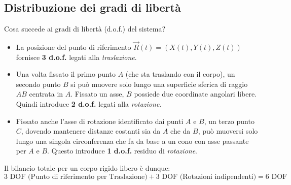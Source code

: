 \subsection{Distribuzione dei gradi di libertà}
Cosa succede ai gradi di libertà (d.o.f.) del sistema?
\begin{itemize}
    \item La posizione del punto di riferimento $\vec{R}(t) = (X(t), Y(t), Z(t))$ fornisce \textbf{3 d.o.f.} legati alla \textit{traslazione}.
    \item Una volta fissato il primo punto $A$ (che sta traslando con il corpo), un secondo punto $B$ si può muovere solo lungo una superficie sferica di raggio $AB$ centrata in $A$. Fissato un asse, $B$ possiede due coordinate angolari libere. Quindi introduce \textbf{2 d.o.f.} legati alla \textit{rotazione}.
    \item Fissato anche l'asse di rotazione identificato dai punti $A$ e $B$, un terzo punto $C$, dovendo mantenere distanze costanti sia da $A$ che da $B$, può muoversi solo lungo una singola circonferenza che fa da base a un cono con asse passante per $A$ e $B$. Questo introduce \textbf{1 d.o.f.} residuo di \textit{rotazione}.
\end{itemize}

Il bilancio totale per un corpo rigido libero è dunque:
\begin{equation*}
    \text{3 DOF (Punto di riferimento per Traslazione)} + \text{3 DOF (Rotazioni indipendenti)} = \text{6 DOF}
\end{equation*}

